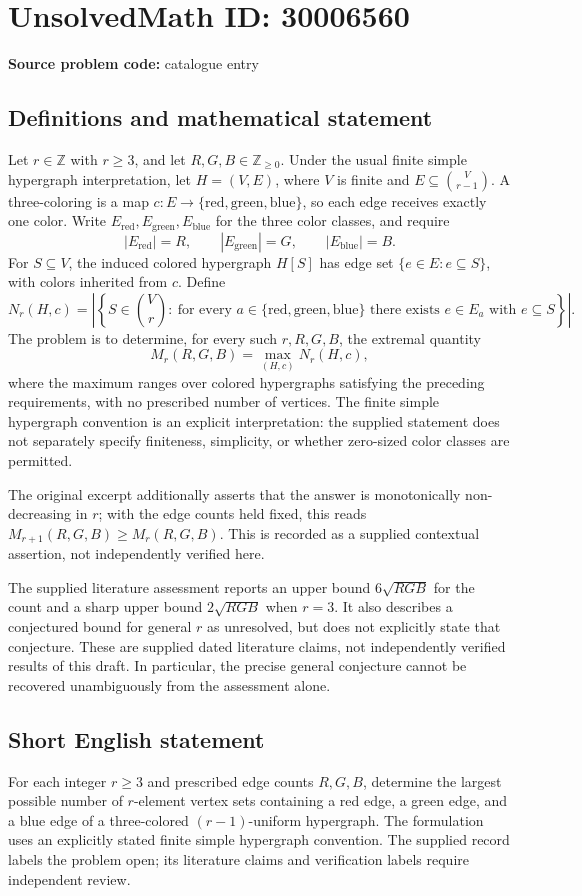 \documentclass[11pt]{article}
\newcommand{\Z}{\mathbb{Z}}
\begin{document}
\section*{UnsolvedMath ID: 30006560}
\textbf{Source problem code:} catalogue entry
\subsection{Definitions and mathematical statement}
Let \(r\in\Z\) with \(r\geq3\), and let \(R,G,B\in\Z_{\geq0}\). Under the usual finite simple hypergraph interpretation, let \(H=(V,E)\), where \(V\) is finite and \(E\subseteq\binom{V}{r-1}\). A three-coloring is a map \(c:E\to\{\mathrm{red},\mathrm{green},\mathrm{blue}\}\), so each edge receives exactly one color. Write \(E_{\mathrm{red}},E_{\mathrm{green}},E_{\mathrm{blue}}\) for the three color classes, and require
\[
|E_{\mathrm{red}}|=R,\qquad |E_{\mathrm{green}}|=G,\qquad |E_{\mathrm{blue}}|=B.
\]
For \(S\subseteq V\), the induced colored hypergraph \(H[S]\) has edge set \(\{e\in E:e\subseteq S\}\), with colors inherited from \(c\). Define
\[
N_r(H,c)=\left|\left\{S\in\binom{V}{r}:\ \text{for every }a\in\{\mathrm{red},\mathrm{green},\mathrm{blue}\}\text{ there exists }e\in E_a\text{ with }e\subseteq S\right\}\right|.
\]
The problem is to determine, for every such \(r,R,G,B\), the extremal quantity
\[
M_r(R,G,B)=\max_{(H,c)}N_r(H,c),
\]
where the maximum ranges over colored hypergraphs satisfying the preceding requirements, with no prescribed number of vertices. The finite simple hypergraph convention is an explicit interpretation: the supplied statement does not separately specify finiteness, simplicity, or whether zero-sized color classes are permitted.

The original excerpt additionally asserts that the answer is monotonically non-decreasing in \(r\); with the edge counts held fixed, this reads \(M_{r+1}(R,G,B)\geq M_r(R,G,B)\). This is recorded as a supplied contextual assertion, not independently verified here.

The supplied literature assessment reports an upper bound \(6\sqrt{RGB}\) for the count and a sharp upper bound \(2\sqrt{RGB}\) when \(r=3\). It also describes a conjectured bound for general \(r\) as unresolved, but does not explicitly state that conjecture. These are supplied dated literature claims, not independently verified results of this draft. In particular, the precise general conjecture cannot be recovered unambiguously from the assessment alone.
\subsection{Short English statement}
For each integer \(r\geq3\) and prescribed edge counts \(R,G,B\), determine the largest possible number of \(r\)-element vertex sets containing a red edge, a green edge, and a blue edge of a three-colored \((r-1)\)-uniform hypergraph. The formulation uses an explicitly stated finite simple hypergraph convention. The supplied record labels the problem open; its literature claims and verification labels require independent review.
\end{document}
